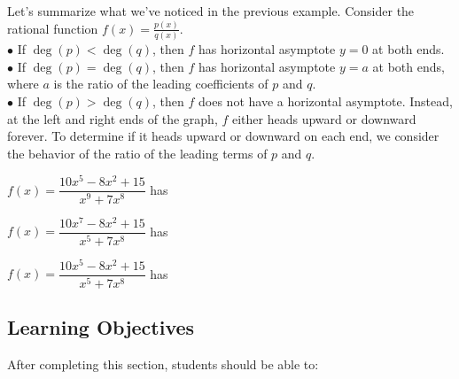 \documentclass{ximera}
\begin{document}
Let's summarize what we've noticed in the previous example. Consider the rational function $f(x)=\frac{p(x)}{q(x)}$. 
\\$\bullet$ If $\deg(p)<\deg(q)$, then $f$ has horizontal asymptote $y=0$ at both ends. %
\\$\bullet$  If $\deg(p)=\deg(q)$, then $f$ has horizontal asymptote $y=a$ at both ends, where $a$ is the ratio of the leading coefficients of $p$ and $q$. %
\\$\bullet$ If $\deg(p)>\deg(q)$, then $f$ does not have a horizontal asymptote. Instead, at the left and right ends of the graph, $f$ either heads upward or downward forever. To determine if it heads upward or downward on each end, we consider the behavior of the ratio of the leading terms of $p$ and $q$.



\begin{example} $f(x)=\dfrac{10x^5-8x^2+15}{x^9+7x^8}$ has 
     \begin{multipleChoice}
  \end{multipleChoice}
  
    $f(x)=\dfrac{10x^7-8x^2+15}{x^5+7x^8}$ has 
     \begin{multipleChoice}
  \end{multipleChoice}
  
  $f(x)=\dfrac{10x^5-8x^2+15}{x^5+7x^8}$ has 
     \begin{multipleChoice}
  \end{multipleChoice}
\end{example}

\subsection{Learning Objectives}
After completing this section, students should be able to:
\vspace{.05in}
\end{document}
